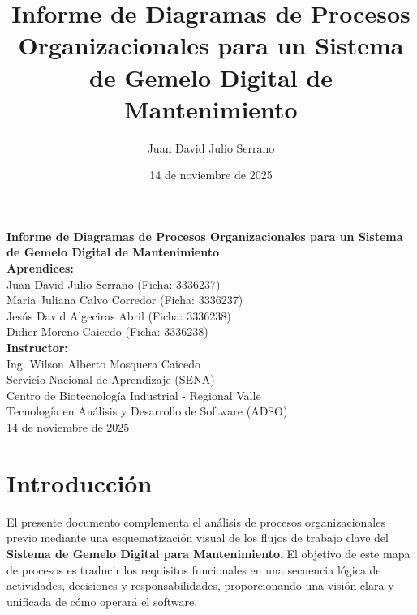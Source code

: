 \documentclass[12pt, a4paper]{article}
\title{Informe de Diagramas de Procesos Organizacionales para un Sistema de Gemelo Digital de Mantenimiento}
\author{Juan David Julio Serrano}
\date{14 de noviembre de 2025}
\begin{document}
\begin{titlepage}
    \begin{center}
        \vspace*{2.5cm}
        {\Huge \bfseries Informe de Diagramas de Procesos Organizacionales para un Sistema de Gemelo Digital de Mantenimiento}\\[2cm]
        
        {\large \bfseries Aprendices:}\\[0.5cm]
        \large{Juan David Julio Serrano (Ficha: 3336237)}\\[0.3cm]
        \large{Maria Juliana Calvo Corredor (Ficha: 3336237)}\\[0.3cm]
        \large{Jesús David Algeciras Abril (Ficha: 3336238)}\\[0.3cm]
        \large{Didier Moreno Caicedo (Ficha: 3336238)}\\[1.2cm]
        
        {\large \bfseries Instructor:}\\[0.5cm]
        \large{Ing. Wilson Alberto Mosquera Caicedo}\\[1.5cm]
        
        \vspace{1cm}
        \large{Servicio Nacional de Aprendizaje (SENA)}\\[0.4cm]
        \large{Centro de Biotecnología Industrial - Regional Valle}\\[0.4cm]
        \large{Tecnología en Análisis y Desarrollo de Software (ADSO)}\\[1.2cm]
        \large{14 de noviembre de 2025}
    \end{center}
\end{titlepage}

\doublespacing

\section{Introducción}

El presente documento complementa el análisis de procesos organizacionales previo mediante una esquematización visual de los flujos de trabajo clave del \textbf{Sistema de Gemelo Digital para Mantenimiento}. El objetivo de este mapa de procesos es traducir los requisitos funcionales en una secuencia lógica de actividades, decisiones y responsabilidades, proporcionando una visión clara y unificada de cómo operará el software.
\end{document}
